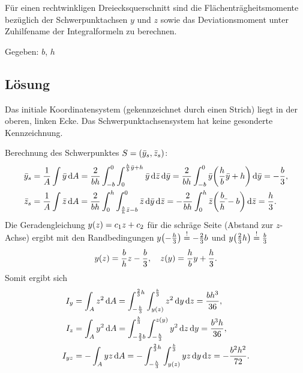 \documentclass{exercise}
\begin{document}
    \begin{problem}
        Für einen rechtwinkligen Dreiecksquerschnitt sind die Flächenträgheitsmomente bezüglich der Schwerpunktachsen \(y\) und \(z\) sowie das Deviationsmoment unter Zuhilfename der Integralformeln zu berechnen.
        \begin{center}
        \end{center}

        Gegeben: \(b\), \(h\)
    \end{problem}

    \subsection*{Lösung}
    Das initiale Koordinatensystem (gekennzeichnet durch einen Strich) liegt in der oberen, linken Ecke.
    Das Schwerpunktachsensystem hat keine gesonderte Kennzeichnung.

    Berechnung des Schwerpunktes \(S = \parentheses*{\bar{y}_s, \bar{z}_s}\):
    \begin{align*}
        \bar{y}_s &= \frac{1}{A}\int\bar{y}\d A = \frac{2}{bh}\int_{-b}^0 \int_0^{\frac{h}{b}\bar{y} + h}\bar{y}\d\bar{z}\d\bar{y} = \frac{2}{bh}\int_{-b}^0 \bar{y}\parentheses*{\frac{h}{b}\bar{y} + h}\d\bar{y} = -\frac{b}{3},\\
        \bar{z}_s &= \frac{1}{A}\int\bar{z}\d A = \frac{2}{bh}\int_0^h \int_{\frac{b}{h}\bar{z} - b}^0 \bar{z}\d\bar{y}\d\bar{z} = -\frac{2}{bh}\int_0^h \bar{z}\parentheses*{\frac{b}{h}\bar{} - b}\d\bar{z} = \frac{h}{3}.
    \end{align*}
    Die Geradengleichung \(y\parentheses*{z} = c_1 z + c_2\) für die schräge Seite (Abstand zur \(z\)-Achse) ergibt mit den Randbedingungen \(y\parentheses*{-\frac{h}{3}} \stackrel{!}{=} -\frac{2}{3}b\) und \(y\parentheses*{\frac{2}{3}h} \stackrel{!}{=} \frac{b}{3}\)
    \[
        y\parentheses*{z} = \frac{b}{h}z - \frac{b}{3}, \quad z\parentheses*{y} = \frac{h}{b}y + \frac{h}{3}.
    \]
    Somit ergibt sich
    \begin{align*}
        I_y &= \int_A z^2\d A = \int_{-\frac{h}{3}}^{\frac{2}{3}h}\int_{y\parentheses*{z}}^{\frac{b}{3}}z^2\d y\d z = \frac{bh^3}{36},\\
        I_z &= \int_A y^2\d A = \int_{-\frac{2}{3}b}^{\frac{b}{3}}\int_{-\frac{h}{3}}^{z\parentheses*{y}}y^2\d z\d y = \frac{b^3 h}{36},\\
        I_{yz} &= -\int_A yz\d A = -\int_{-\frac{h}{3}}^{\frac{2}{3}h}\int_{y\parentheses*{z}}^{\frac{b}{3}}yz\d y\d z = -\frac{b^2 h^2}{72}.
    \end{align*}
\end{document}
